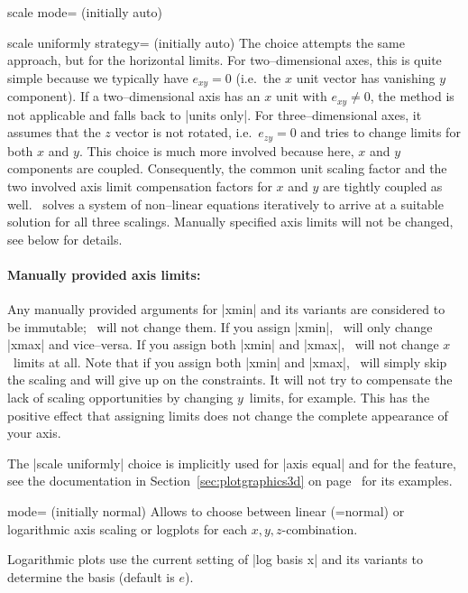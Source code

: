 \begin{pgfplotskey}{scale mode= (initially auto)}
\begin{pgfplotskey}{scale uniformly strategy= (initially auto)}
		The choice  attempts the same approach, but for the horizontal limits. For two--dimensional axes, this is quite simple because we typically have $e_{xy} = 0$ (i.e.\ the $x$ unit vector has vanishing $y$ component). If a two--dimensional axis has an $x$ unit with $e_{xy} \neq 0$, the method is not applicable and falls back to |units only|. For three--dimensional axes, it assumes that the $z$ vector is not rotated, i.e.\ $e_{zy} = 0$ and tries to change limits for both $x$ and $y$. This choice is much more involved because here, $x$ and $y$ components are coupled. Consequently, the common unit scaling factor and the two involved axis limit compensation factors for $x$ and $y$ are tightly coupled as well. \PGFPlots\ solves a system of non--linear equations iteratively to arrive at a suitable solution for all three scalings. Manually specified axis limits will not be changed, see below for details.

	\end{pgfplotskey}

	\paragraph{Manually provided axis limits:} Any manually provided arguments for |xmin| and its variants are considered to be immutable; \PGFPlots\ will not change them. If you assign |xmin|, \PGFPlots\ will only change |xmax| and vice--versa. If you assign both |xmin| and |xmax|, \PGFPlots\ will not change $x$~limits at all. Note that if you assign both |xmin| and |xmax|, \PGFPlots\ will simply skip the scaling and will give up on the constraints. It will not try to compensate the lack of scaling opportunities by changing $y$~limits, for example. This has the positive effect that assigning limits does not change the complete appearance of your axis. 

	The |scale uniformly| choice is implicitly used for |axis equal| and for the  feature, see the documentation in Section~\ref{sec:plotgraphics3d} on page~\pageref{sec:plotgraphics3d} for its examples.
\end{pgfplotskey}

\begin{pgfplotsxykey}{\x mode= (initially normal)}
	Allows to choose between linear (=normal) or logarithmic axis scaling or logplots for each $x,y,z$-combination.

	Logarithmic plots use the current setting of |log basis x| and its variants to determine the basis (default is $e$).
\end{pgfplotsxykey}

